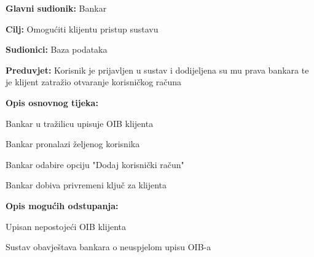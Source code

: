             
            	\noindent {}
            	\begin{packed_item}
            		
            		\item \textbf{Glavni sudionik: }Bankar
            		\item  \textbf{Cilj:} Omogućiti klijentu pristup sustavu
            		\item  \textbf{Sudionici:} Baza podataka
            		\item  \textbf{Preduvjet:} Korisnik je prijavljen u sustav i dodijeljena su mu prava bankara te je klijent zatražio otvaranje korisničkog računa
            		\item  \textbf{Opis osnovnog tijeka:}
            		
            		\item[] \begin{packed_enum}
            			
            			\item Bankar u tražilicu upisuje OIB klijenta
            			\item Bankar pronalazi željenog korisnika
            			\item Bankar odabire opciju "Dodaj korisnički račun"
            			\item Bankar dobiva privremeni ključ za klijenta
            		\end{packed_enum}
            		
            		\item  \textbf{Opis mogućih odstupanja:} 
            		
            		\item[] \begin{packed_item}
            			
            			\item[1.a] Upisan nepostojeći OIB klijenta
            			\item[] \begin{packed_enum}
            				
            				\item Sustav obavještava bankara o neuspjelom upisu OIB-a
            				
            			\end{packed_enum}
            			
            		\end{packed_item}
            	\end{packed_item}
            
